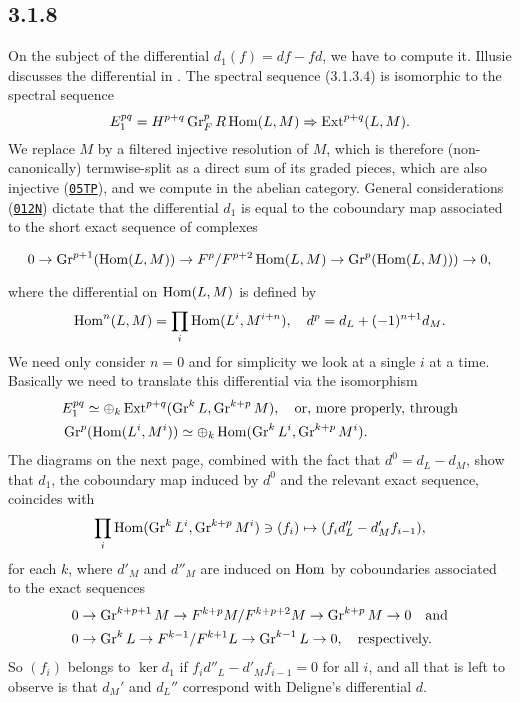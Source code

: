 \documentclass[deligne.tex]{subfiles}
\begin{document}
\subsection*{3.1.8} On the subject of the differential $d_1(f)=df-fd$,
we have to compute it. Illusie discusses the differential in
\cite[V 1.4.10]{Cotangent}.
The spectral sequence (3.1.3.4) is isomorphic to the spectral sequence
\begin{equation*}
	E_1^{pq}=H^{p+q}\operatorname{Gr}_F^pR\operatorname{Hom}(L,M)\Rightarrow\operatorname{Ext}^{p+q}(L,M).
\end{equation*}
We replace $M$ by a filtered injective resolution of $M$, which is 
therefore (non-canonically) termwise-split as a direct sum of its graded
pieces, which are also injective
(\href{https://stacks.math.columbia.edu/tag/05TP}{\texttt{05TP}}), and
we compute in the abelian category.
General considerations
(\href{https://stacks.math.columbia.edu/tag/012N}{\texttt{012N}}) dictate
that the differential $d_1$ is equal to the coboundary map
associated to the short exact sequence of complexes
\begin{ceqn}\begin{equation*}
	0\rightarrow\operatorname{Gr}^{p+1}(\operatorname{Hom}(L,M))\rightarrow F^p/F^{p+2} \operatorname{Hom}(L,M)
	\rightarrow\operatorname{Gr}^p(\operatorname{Hom}(L,M)))\rightarrow0,
\end{equation*}\end{ceqn}
where the differential on $\operatorname{Hom}(L,M)$ is defined by
\begin{equation*}
	\operatorname{Hom}^n(L,M)=\prod_i\operatorname{Hom}(L^i,M^{i+n}),\quad d^p=d_L+(-1)^{n+1}d_M.
\end{equation*}
We need only consider $n=0$ and for simplicity we look at a single $i$ at a
time. Basically we need to translate this differential via the isomorphism
\begin{align*}
	&E_1^{pq}\simeq\oplus_k\operatorname{Ext}^{p+q}(\operatorname{Gr}^kL,\operatorname{Gr}^{k+p}M),\quad\text{or, more properly, through} \\
	&\operatorname{Gr}^p(\operatorname{Hom}(L^i,M^i))\simeq\oplus_k\operatorname{Hom}(\operatorname{Gr}^kL^i,\operatorname{Gr}^{k+p}M^i).
\end{align*}
The diagrams on the next page, combined with the fact that $d^0=d_L-d_M$,
show that $d_1$, the coboundary map induced 
by $d^0$ and the relevant exact sequence, coincides with
\begin{equation*}
	\prod_i\operatorname{Hom}(\operatorname{Gr}^kL^i,\operatorname{Gr}^{k+p}M^i)\ni (f_i)\mapsto (f_id''_L-d'_Mf_{i-1}),
\end{equation*}
for each $k$, where $d'_M$ and $d''_M$ are induced on $\operatorname{Hom}$ by
coboundaries associated to the exact sequences
\begin{align*}
	&0\rightarrow\operatorname{Gr}^{k+p+1}M\rightarrow F^{k+p}M/F^{k+p+2}M\rightarrow\operatorname{Gr}^{k+p}M\rightarrow0\quad\text{and} \\
	&0\rightarrow\operatorname{Gr}^kL\rightarrow F^{k-1}/F^{k+1}L\rightarrow\operatorname{Gr}^{k-1}L\rightarrow0,\quad\text{respectively.}
\end{align*}
So $(f_i)$ belongs to $\ker d_1$ if $f_id''_L-d'_Mf_{i-1}=0$ for all $i$,
and all that is left to observe is that $d_M'$ and $d_L''$ correspond with
Deligne's differential $d$.
\end{document}
